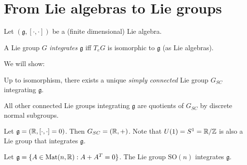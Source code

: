 \section{From Lie algebras to Lie groups}
 Let $(\mathfrak g, [\cdot , \cdot ])$ be a (finite dimensional) Lie algebra.


\begin{definition}
       A Lie group $G$ \emph{integrates} $\mathfrak g$ iff $T_eG$  is isomorphic to $\mathfrak g$ (as Lie algebras).
\end{definition}
We will show:
\begin{theorem}[A]
    Up to isomorphism, there exists a unique \emph{simply connected}
      Lie group $G_{SC}$ integrating $\mathfrak g$.
\end{theorem}
\begin{remark}
    All other connected Lie groups integrating $\mathfrak g$ are quotients of $G_{SC}$ by discrete normal subgroups.
\end{remark}
\begin{eg}
    Let $\mathfrak g = (\mathbb{R}, [\cdot ,\cdot ]=0)$.
    Then $G_{SC} = (\mathbb{R}, +)$.
    Note that $U(1) = S^{1} = \mathbb{R} /  \mathbb{Z}$ is also a Lie group that integrates $\mathfrak g$.
\end{eg}


\begin{eg}
    Let $\mathfrak g = \{A\in \text{Mat}(n, \mathbb{R}): A+A^T=0\}$.
    The Lie group $\text{SO}(n)$ integrates $\mathfrak g$.
\end{eg}

